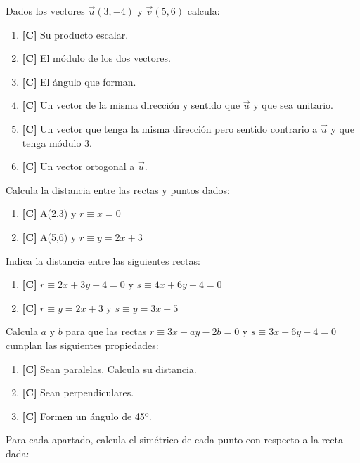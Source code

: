 \Exercicio Dados los vectores $ \vec{u}(3,-4)$ y $ \vec{v} (5,6) $ calcula:

\begin{enumerate}[topsep=0pt]
\item \textbf{[C]} Su producto escalar.
	\item \textbf{[C]} El módulo de los dos vectores.
	\item \textbf{[C]} El ángulo que forman.
	\item \textbf{[C]} Un vector de la misma dirección y sentido que $\vec{u}$ y que sea unitario.
	\item \textbf{[C]} Un vector que tenga la misma dirección pero sentido contrario a $\vec{u}$ y que tenga módulo 3.
	\item \textbf{[C]} Un vector ortogonal a $\vec{u}$.
\end{enumerate}


\Exercicio Calcula la distancia entre las rectas y puntos dados:

\begin{enumerate}[topsep=0pt]
\item \textbf{[C]} A(2,3) y $ r \equiv x = 0 $
	\item \textbf{[C]} A(5,6) y $ r \equiv y = 2x + 3 $
\end{enumerate}


\Exercicio Indica la distancia entre las siguientes rectas:

\begin{enumerate}[topsep=0pt]
\item \textbf{[C]} $ r \equiv 2x + 3y +4 = 0 $ y $ s \equiv 4x + 6y - 4 = 0 $
	\item \textbf{[C]} $ r \equiv y = 2x + 3 $ y $ s \equiv y = 3x - 5 $
\end{enumerate}


\Exercicio Calcula $a$ y $b$ para que las rectas  $r \equiv 3x-ay -2b = 0$ y $s \equiv 3x-6y +4 = 0$ cumplan las siguientes propiedades:

\begin{enumerate}[topsep=0pt]
\item \textbf{[C]} Sean paralelas. Calcula su distancia.
	\item \textbf{[C]} Sean perpendiculares.
	\item \textbf{[C]} Formen un ángulo de 45º.
\end{enumerate}


\Exercicio Para cada apartado, calcula el simétrico de cada punto con respecto a la recta dada:

